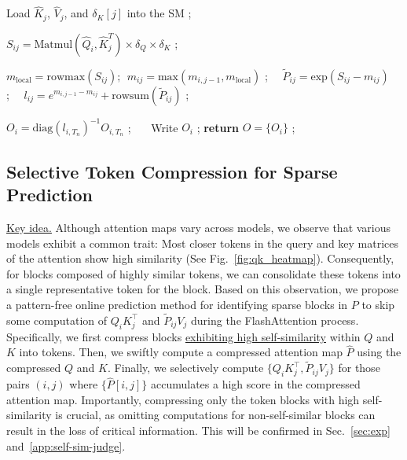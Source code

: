 \begin{algorithm*}[t!]
\begin{algorithmic}[1]
                \STATE Load $\hat K_j$, $\hat V_j$, and $\delta_K[j]$ into the SM ;

                \STATE $S_{ij} = \mathrm{Matmul}(\hat Q_i, \hat K_j^T) \times \delta_Q \times \delta_K$ ;  

                \STATE $m_\mathrm{local} = \mathrm{rowmax}(S_{ij}) ;~~ m_{ij} = \mathrm{max}(m_{i,j-1}, m_\mathrm{local})$ ;~~ $ \widetilde P_{ij} = \mathrm{exp}(S_{ij} - m_{ij})$ ;~~ $l_{ij} = e^{m_{i,j-1}-m_{ij}} + \mathrm{rowsum}(\widetilde P_{ij})$ ;
    
                \STATE {}

                  \label{alg:condition2}

                    \STATE {}
                \ENDIF
            \ENDIF
        \ENDFOR
        \STATE $O_i = \mathrm{diag}(l_{i,T_n})^{-1} O_{i,T_n}$ ;~~~ Write $O_i$ ;
    \ENDFOR
    \STATE \textbf{return} $O = \{O_i\}$ ;
    \end{algorithmic}
    \vspace{-.2em}
\end{algorithm*}
\subsection{Selective Token Compression for Sparse Prediction}  \label{sec:stage1}
\underline{Key idea.} 
Although attention maps vary across models, we observe that various models exhibit a common trait: 
Most closer tokens in the query and key matrices of the attention show high similarity (See Fig.~\ref{fig:qk_heatmap}). Consequently, for blocks composed of highly similar tokens, we can consolidate these tokens into a single representative token for the block. Based on this observation, we propose a pattern-free online prediction method for identifying sparse blocks in $P$ to skip some computation of $Q_iK_j^\top$ and $\widetilde{P}_{ij} V_j$ during the FlashAttention process. Specifically, we first compress blocks \uline{exhibiting high self-similarity} within \(Q\) and \(K\) into tokens. Then, we swiftly compute a compressed attention map \(\hat P\) using the compressed \(Q\) and \(K\). Finally, we selectively compute \(\{Q_iK_j^\top, \widetilde{P}_{ij} V_j\}\) for those pairs \((i, j)\) where \(\{\hat P[i,j]\}\) accumulates a high score in the compressed attention map.
Importantly, compressing only the token blocks with high self-similarity is crucial, as omitting computations for non-self-similar blocks can result in the loss of critical information. This will be confirmed in Sec.~\ref{sec:exp} and~\ref{app:self-sim-judge}. 


